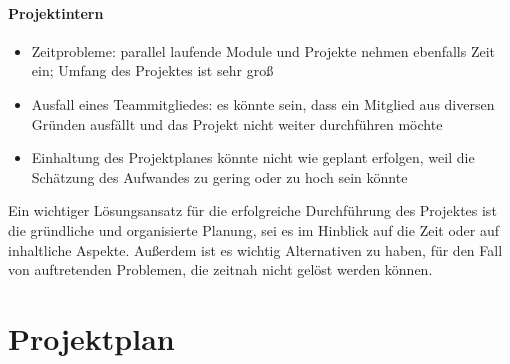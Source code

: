 \documentclass[12pt]{scrartcl}
\begin{document}
\paragraph{Projektintern}
\begin{itemize}
\item Zeitprobleme: parallel laufende Module und Projekte nehmen ebenfalls Zeit ein; Umfang des Projektes ist sehr groß 
\item Ausfall eines Teammitgliedes: es könnte sein, dass ein Mitglied aus diversen Gründen ausfällt und das Projekt nicht weiter durchführen möchte
\item Einhaltung des Projektplanes könnte nicht wie geplant erfolgen, weil die Schätzung des Aufwandes zu gering oder zu hoch sein könnte
\end{itemize}


Ein wichtiger Lösungsansatz für die erfolgreiche Durchführung des Projektes ist die gründliche und organisierte Planung, sei es im Hinblick auf die Zeit oder auf inhaltliche Aspekte.  Außerdem ist es wichtig Alternativen zu haben, für den Fall von auftretenden Problemen, die zeitnah nicht gelöst werden können.


\section{Projektplan}


 



\newpage

\listoffigures

\newpage

\listoftables
\end{document}
